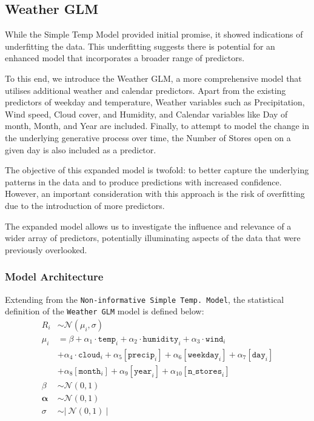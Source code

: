 \subsection{Weather GLM}

While the Simple Temp Model provided initial promise, it showed indications of
underfitting the data. This underfitting suggests there is potential for an
enhanced model that incorporates a broader range of predictors.

To this end, we introduce the Weather GLM, a more comprehensive model that
utilises additional weather and calendar predictors. Apart from the existing
predictors of weekday and temperature, Weather variables such as
Precipitation, Wind speed, Cloud cover, and Humidity, and Calendar variables
like Day of month, Month, and Year are included. Finally, to attempt to model 
the change in the underlying generative process over time, the Number of Stores 
open on a given day is also included as a predictor.

The objective of this expanded model is twofold: to better capture the
underlying patterns in the data and to produce predictions with increased
confidence. However, an important consideration with this approach is the risk
of overfitting due to the introduction of more predictors.

The expanded model allows us to investigate the influence and relevance of a
wider array of predictors, potentially illuminating aspects of the data that
were previously overlooked.
\subsubsection{Model Architecture}


Extending from the \texttt{Non-informative Simple Temp.\ Model}, the
statistical definition of the \texttt{Weather GLM} model is defined below:
\begin{equation}
  \label{eq:weather_glm_statistical_definition}
  \begin{split}
    R_i &\sim \mathcal{N}(\mu_i, \sigma) \\
    \mu_i &= \beta + \alpha_1 \cdot \texttt{temp}_i + \alpha_2 \cdot \texttt{humidity}_i + \alpha_3 \cdot \texttt{wind}_i \\ &+ \alpha_4 \cdot \texttt{cloud}_i + \alpha_5[\texttt{precip}_i] + \alpha_6[\texttt{weekday}_i] + \alpha_7[\texttt{day}_i] \\ &+ \alpha_8[\texttt{month}_i] + \alpha_9[\texttt{year}_i] + \alpha_{10}[\texttt{n\_stores}_i] \\
    \beta &\sim \mathcal{N}(0, 1) \\
    \boldsymbol{\alpha} &\sim \mathcal{N}(0, 1) \\
    \sigma &\sim \left| \ \mathcal{N}(0,1) \ \right|
  \end{split}
\end{equation}

